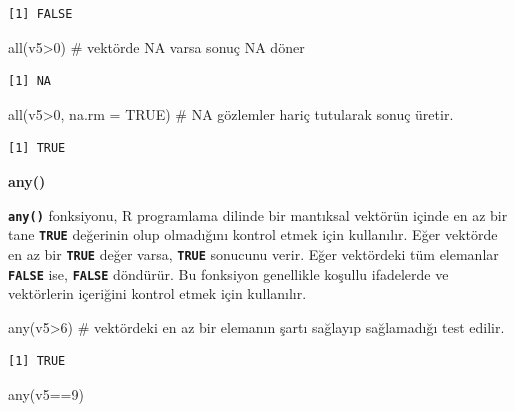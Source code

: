 \documentclass[
  letterpaper,
  DIV=11,
  numbers=noendperiod]{scrreprt}
\newenvironment{Shaded}{\begin{snugshade}}{\end{snugshade}}
\newcommand{\AttributeTok}[1]{\textcolor[rgb]{0.40,0.45,0.13}{#1}}
\newcommand{\CommentTok}[1]{\textcolor[rgb]{0.37,0.37,0.37}{#1}}
\newcommand{\ConstantTok}[1]{\textcolor[rgb]{0.56,0.35,0.01}{#1}}
\newcommand{\DecValTok}[1]{\textcolor[rgb]{0.68,0.00,0.00}{#1}}
\newcommand{\FunctionTok}[1]{\textcolor[rgb]{0.28,0.35,0.67}{#1}}
\newcommand{\NormalTok}[1]{\textcolor[rgb]{0.00,0.23,0.31}{#1}}
\newcommand{\SpecialCharTok}[1]{\textcolor[rgb]{0.37,0.37,0.37}{#1}}
\begin{document}
\begin{verbatim}
[1] FALSE
\end{verbatim}

\begin{Shaded}
\begin{Highlighting}[]
\FunctionTok{all}\NormalTok{(v5}\SpecialCharTok{\textgreater{}}\DecValTok{0}\NormalTok{) }\CommentTok{\# vektörde NA varsa sonuç NA döner}
\end{Highlighting}
\end{Shaded}

\begin{verbatim}
[1] NA
\end{verbatim}

\begin{Shaded}
\begin{Highlighting}[]
\FunctionTok{all}\NormalTok{(v5}\SpecialCharTok{\textgreater{}}\DecValTok{0}\NormalTok{, }\AttributeTok{na.rm =} \ConstantTok{TRUE}\NormalTok{) }\CommentTok{\# NA gözlemler hariç tutularak sonuç üretir.}
\end{Highlighting}
\end{Shaded}

\begin{verbatim}
[1] TRUE
\end{verbatim}

\textbf{any()}

\textbf{\texttt{any()}} fonksiyonu, R programlama dilinde bir mantıksal
vektörün içinde en az bir tane \textbf{\texttt{TRUE}} değerinin olup
olmadığını kontrol etmek için kullanılır. Eğer vektörde en az bir
\textbf{\texttt{TRUE}} değer varsa, \textbf{\texttt{TRUE}} sonucunu
verir. Eğer vektördeki tüm elemanlar \textbf{\texttt{FALSE}} ise,
\textbf{\texttt{FALSE}} döndürür. Bu fonksiyon genellikle koşullu
ifadelerde ve vektörlerin içeriğini kontrol etmek için kullanılır.

\begin{Shaded}
\begin{Highlighting}[]
\FunctionTok{any}\NormalTok{(v5}\SpecialCharTok{\textgreater{}}\DecValTok{6}\NormalTok{) }\CommentTok{\# vektördeki en az bir elemanın şartı sağlayıp sağlamadığı test edilir.}
\end{Highlighting}
\end{Shaded}

\begin{verbatim}
[1] TRUE
\end{verbatim}

\begin{Shaded}
\begin{Highlighting}[]
\FunctionTok{any}\NormalTok{(v5}\SpecialCharTok{==}\DecValTok{9}\NormalTok{) }
\end{Highlighting}
\end{Shaded}
\end{document}
